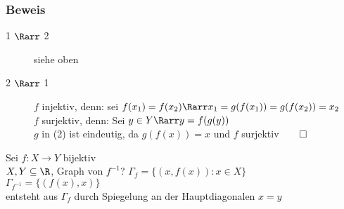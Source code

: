 \subsubsection*{Beweis}
\begin{description}
\item[1 $\Rarr$ 2] siehe oben
\item[2 $\Rarr$ 1] $f$ injektiv, denn: sei $f(x_1) = f(x_2) \Rarr x_1 = g(f(x_1)) = g(f(x_2)) = x_2$\\
$f$ surjektiv, denn: Sei $y \in Y \Rarr y = f(g(y))$\\
$g$ in (2) ist eindeutig, da $g(f(x)) = x$ und $f$ surjektiv$\qed$
\end{description}
Sei $f:X\to Y$ bijektiv\\
$X, Y \subseteq \R$, Graph von $f^{-1}$?
$\Gamma_f = \{(x, f(x)): x \in X\}$\\
$\Gamma_{f^{-1}} = \{(f(x), x)\}$\\
entsteht aus $\Gamma_f$ durch Spiegelung an der Hauptdiagonalen $x = y$\\
